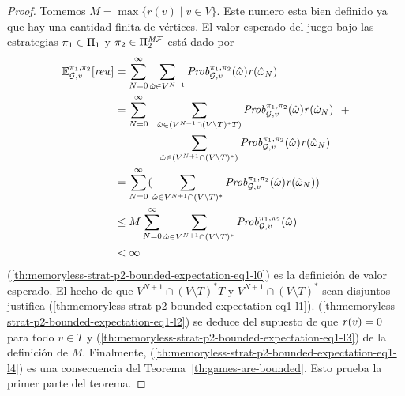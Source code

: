 \begin{proof}
  Tomemos $M = \max \{r(v) \mid v \in V\}$.  Este numero esta bien definido ya que
  hay una cantidad finita de vértices.
  El valor esperado del juego bajo las estrategias
  $\pi_{1} \in \Pi_{1}$ y $\pi_{2} \in \Pi^{\textit{M}\mathcal{F}}_{2}$
  está dado por
  \begin{align}	
    \label{th:memoryless-strat-p2-bounded-expectation-eq1-l0}
    \mathbb{E}^{\pi_{1}, \pi_{2}}_{\mathcal{G},v}[\textit{rew}]
    & = \sum^{\infty}_{N=0} \sum_{\hat{\omega} \in V^{N+1}} \mathit{Prob}^{\pi_{1}, \pi_{2}}_{\mathcal{G},v}(\hat{\omega})\mathit{r}(\hat{\omega}_N) \\
    \label{th:memoryless-strat-p2-bounded-expectation-eq1-l1}	
    & = \sum^{\infty}_{N=0} \ \ \sum_{\hat{\omega} \in (V^{N+1} \cap (V \setminus T)^*T)} \mathit{Prob}^{\pi_{1}, \pi_{2}}_{\mathcal{G},v}(\hat{\omega})  \mathit{r}(\hat{\omega}_N) \ \ + \notag\\
    &\hspace*{4em} \sum_{\hat{\omega} \in (V^{N+1} \cap (V \setminus T)^*)} \mathit{Prob}^{\pi_{1}, \pi_{2}}_{\mathcal{G},v}(\hat{\omega}) \mathit{r}(\hat{\omega}_N)   \\
    \label{th:memoryless-strat-p2-bounded-expectation-eq1-l2}
    & =  \sum^{\infty}_{N=0}  (\sum_{\hat{\omega} \in V^{N+1} \cap (V \setminus T)^*} \mathit{Prob}^{\pi_{1}, \pi_{2}}_{\mathcal{G},v}(\hat{\omega}) \mathit{r}(\hat{\omega}_N) ) \\
    \label{th:memoryless-strat-p2-bounded-expectation-eq1-l3}
    & \leq M \sum^{\infty}_{N=0}  \sum_{\hat{\omega} \in V^{N+1} \cap (V \setminus T)^*} \mathit{Prob}^{\pi_{1}, \pi_{2}}_{\mathcal{G},v}(\hat{\omega})  \\
    \label{th:memoryless-strat-p2-bounded-expectation-eq1-l4}
    & < \infty 
  \end{align}
  (\ref{th:memoryless-strat-p2-bounded-expectation-eq1-l0}) es la
  definición de valor esperado.
  El hecho de que $V^{N+1} \cap (V \setminus T)^*T$ y
  $V^{N+1} \cap (V \setminus T)^*$ sean disjuntos justifica
  (\ref{th:memoryless-strat-p2-bounded-expectation-eq1-l1}).
  (\ref{th:memoryless-strat-p2-bounded-expectation-eq1-l2}) se deduce
  del supuesto de que $\mathit{r}(v) = 0$ para todo $v \in T$ y
  (\ref{th:memoryless-strat-p2-bounded-expectation-eq1-l3}) de la
  definición de $M$.
  Finalmente, (\ref{th:memoryless-strat-p2-bounded-expectation-eq1-l4})
  es una consecuencia del Teorema~\ref{th:games-are-bounded}.
  Esto prueba la primer parte del teorema.


\end{proof}
